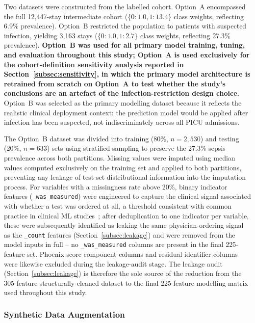 \documentclass[final,3p,times]{elsarticle}
\begin{document}
Two datasets were constructed from the labelled cohort. Option~A
encompassed the full 12,447-stay intermediate cohort ($\{0: 1.0,
1: 13.4\}$ class weights, reflecting 6.9\% prevalence). Option~B
restricted the population to patients with suspected infection,
yielding 3,163 stays ($\{0: 1.0, 1: 2.7\}$ class weights,
reflecting 27.3\% prevalence). \textbf{Option~B was used for all
primary model training, tuning, and evaluation throughout this
study; Option~A is used exclusively for the cohort-definition
sensitivity analysis reported in Section~\ref{subsec:sensitivity},
in which the primary model architecture is retrained from scratch
on Option~A to test whether the study's conclusions are an
artefact of the infection-restriction design choice.} Option~B was
selected as the primary modelling dataset because it reflects the
realistic clinical deployment context: the prediction model would
be applied after infection has been suspected, not indiscriminately
across all PICU admissions.

The Option~B dataset was divided into training (80\%, $n=2{,}530$)
and testing (20\%, $n=633$) sets using stratified sampling to
preserve the 27.3\% sepsis prevalence across both partitions.
Missing values were imputed using median values computed
exclusively on the training set and applied to both partitions,
preventing any leakage of test-set distributional information into
the imputation process. For variables with a missingness rate above 20\%, binary indicator
features (\texttt{\_was\_measured}) were engineered to capture the
clinical signal associated with whether a test was ordered at all,
a threshold consistent with common practice in clinical ML
studies~\cite{deng2022}; after deduplication to one indicator per
variable, these were subsequently identified as leaking the same
physician-ordering signal as the \texttt{\_count} features
(Section~\ref{subsec:leakage}) and were removed from the model
inputs in full -- no \texttt{\_was\_measured} columns are present
in the final 225-feature set. Phoenix score component columns and
residual identifier columns were likewise excluded during the
leakage-audit stage. The leakage audit
(Section~\ref{subsec:leakage}) is therefore the sole source of the
reduction from the 305-feature structurally-cleaned dataset to the
final 225-feature modelling matrix used throughout this study.

\subsubsection{Synthetic Data Augmentation}
\label{subsec:synthetic_intro}
\end{document}
